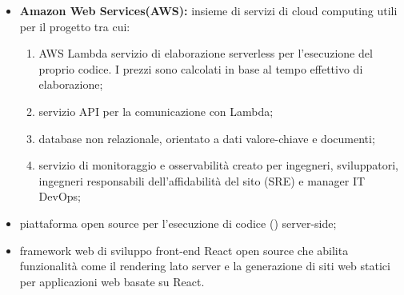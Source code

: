 \begin{itemize}
\item {\bf Amazon Web Services(AWS):} insieme di servizi di cloud computing utili per il progetto tra cui:
\begin{enumerate}
\item {} AWS Lambda servizio di elaborazione serverless per l'esecuzione del proprio codice. I prezzi sono calcolati in base al tempo effettivo di elaborazione;
\item {} servizio API per la comunicazione con Lambda;
\item {} database non relazionale, orientato a dati valore-chiave e documenti;
\item {} servizio di monitoraggio e osservabilità creato per ingegneri, sviluppatori, ingegneri responsabili dell'affidabilità del sito (SRE) e manager IT DevOps;
\end{enumerate}
\item {} piattaforma open source per l'esecuzione di codice () server-side;
\item {} framework web di sviluppo front-end React open source che abilita funzionalità come il rendering lato server e la generazione di siti web statici per applicazioni web basate su React. 
\end{itemize}